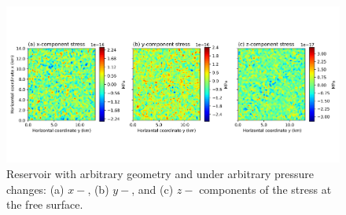 \documentclass[journal abbreviation, manuscript]{copernicus}
\begin{document}
\begin{figure}[h]
\includegraphics[width=12cm]{Fig/Figure_Null_stress_complex_reservoir.png}
\caption{Reservoir with arbitrary geometry and under arbitrary pressure changes: (a) $x-$, (b) $y-$, and (c) $z-$ components of the stress at the free surface.}
\label{fig:Null_stress_complex_reservoir}
\end{figure}











\end{document}
